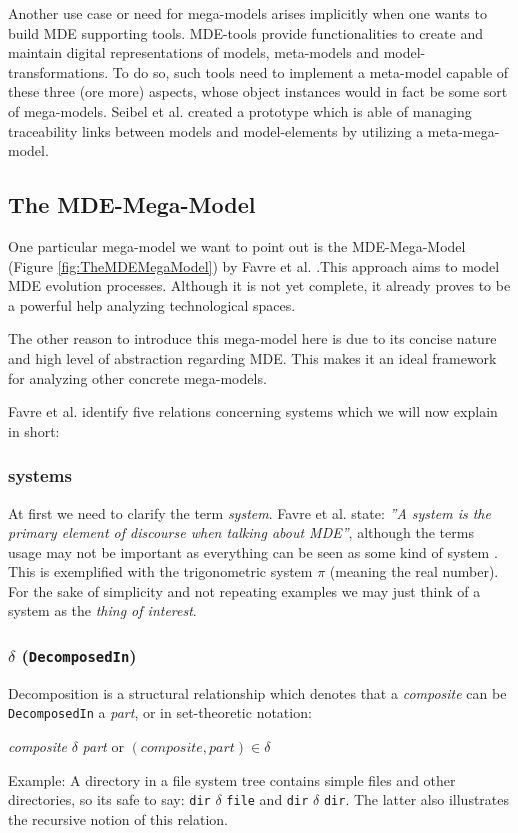 Another use case or need for mega-models arises implicitly when one wants to build MDE supporting tools. MDE-tools provide functionalities to create and maintain digital representations of models, meta-models and model- transformations. To do so, such tools need to implement a meta-model capable of these three (ore more) aspects, whose object instances would in fact be some sort of mega-models. Seibel et al. \cite{DHMM} created a prototype which is able of managing traceability links between models and model-elements by utilizing a meta-mega-model.

\subsection{The MDE-Mega-Model}\label{subsec:TheMDEMegaModel}
One particular mega-model we want to point out is the MDE-Mega-Model (Figure \ref{fig:TheMDEMegaModel}) by Favre et al. \cite{TowardsAMegamodel}.This approach aims to model MDE evolution processes. Although it is not yet complete, it already proves to be a powerful help analyzing technological spaces. 



The other reason to introduce this mega-model here is due to its concise nature and high level of abstraction regarding MDE. This makes it an ideal framework for analyzing other concrete mega-models.

Favre et al. identify five relations concerning systems which we will now explain in short:

\subsubsection{systems} At first we need to clarify the term \textit{system}. Favre et al. state: \textit{''A system is the primary element of discourse when talking about MDE''}, although the terms usage may not be important as everything can be seen as some kind of system \cite{TowardsAMegamodel}. This is exemplified with the trigonometric system $\pi$ (meaning the real number). For the sake of simplicity and not repeating examples we may just think of a system as the \textit{thing of interest}.

\subsubsection{$\delta$ (\texttt{DecomposedIn})}
Decomposition is a structural relationship which denotes that a \textit{composite} can be \texttt{DecomposedIn} a \textit{part}, or in set-theoretic notation: 
\begin{center}
\textit{composite} $\delta$ \textit{part} or $(composite, part) \in \delta$
\end{center}
Example: A directory in a file system tree contains simple files and other directories, so its safe to say: \texttt{dir} $\delta$ \texttt{file} and \texttt{dir} $\delta$ \texttt{dir}. The latter also illustrates the recursive notion of this relation.

